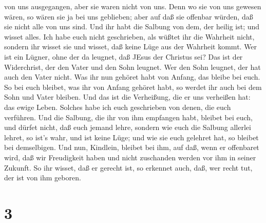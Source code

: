 von uns ausgegangen, aber sie waren nicht von uns. Denn wo sie von uns
gewesen wären, so wären sie ja bei uns geblieben; aber auf daß sie
offenbar würden, daß sie nicht alle von uns sind.  Und ihr
habt die Salbung von dem, der heilig ist; und wisset alles.
 Ich habe euch nicht geschrieben, als wüßtet ihr die
Wahrheit nicht, sondern ihr wisset sie und wisset, daß keine Lüge aus
der Wahrheit kommt.  Wer ist ein Lügner, ohne der da
leugnet, daß JEsus der Christus sei? Das ist der Widerchrist, der den
Vater und den Sohn leugnet.  Wer den Sohn leugnet, der hat
auch den Vater nicht.  Was ihr nun gehöret habt von Anfang,
das bleibe bei euch. So bei euch bleibet, was ihr von Anfang gehöret
habt, so werdet ihr auch bei dem Sohn und Vater bleiben. 
Und das ist die Verheißung, die er uns verheißen hat: das ewige Leben.
 Solches habe ich euch geschrieben von denen, die euch
verführen.  Und die Salbung, die ihr von ihm empfangen
habt, bleibet bei euch, und dürfet nicht, daß euch jemand lehre, sondern
wie euch die Salbung allerlei lehret, so ist's wahr, und ist keine Lüge;
und wie sie euch gelehret hat, so bleibet bei demselbigen. 
Und nun, Kindlein, bleibet bei ihm, auf daß, wenn er offenbaret wird,
daß wir Freudigkeit haben und nicht zuschanden werden vor ihm in seiner
Zukunft.  So ihr wisset, daß er gerecht ist, so erkennet
auch, daß, wer recht tut, der ist von ihm geboren.

\hypertarget{section-2}{%
\section{3}\label{section-2}}

